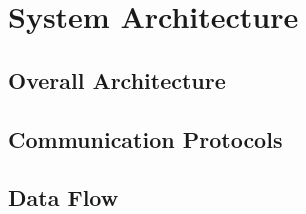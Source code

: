\section{System Architecture}
\label{sec:system_architecture}



\subsection{Overall Architecture}


\subsection{Communication Protocols}

\subsection{Data Flow}
